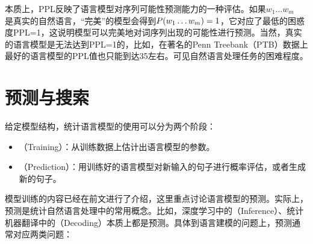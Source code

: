 \parinterval  本质上，PPL反映了语言模型对序列可能性预测能力的一种评估。如果$ w_1\dots w_m $\\是真实的自然语言，``完美''的模型会得到$ {P}(w_1\dots w_m)=1 $，它对应了最低的困惑度PPL=1，这说明模型可以完美地对词序列出现的可能性进行预测。当然，真实的语言模型是无法达到PPL=1的，比如，在著名的Penn Treebank（PTB）数据上最好的语言模型的PPL值也只能到达35左右。可见自然语言处理任务的困难程度。


\sectionnewpage
\section{预测与搜索}

\parinterval 给定模型结构，统计语言模型的使用可以分为两个阶段：

\begin{itemize}
\vspace{0.5em}
\item {\small{}}（Training）：从训练数据上估计出语言模型的参数。
\vspace{0.5em}
\item {\small{}}（Prediction）：用训练好的语言模型对新输入的句子进行概率评估，或者生成新的句子。
\vspace{0.5em}
\end{itemize}

\parinterval 模型训练的内容已经在前文进行了介绍，这里重点讨论语言模型的预测。实际上，预测是统计自然语言处理中的常用概念。比如，深度学习中的{\small{}}（Inference）、统计机器翻译中的{\small{}}（Decoding）本质上都是预测。具体到语言建模的问题上，预测通常对应两类问题：

